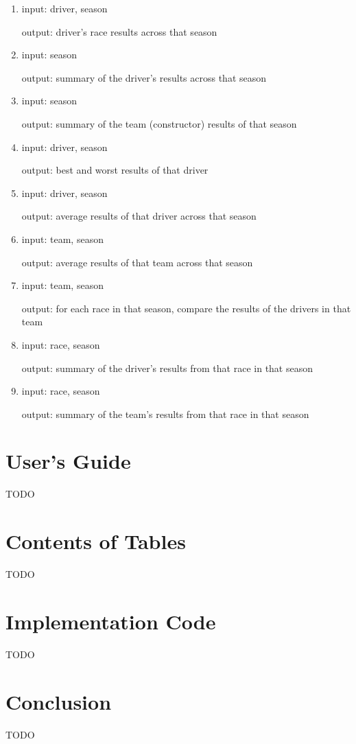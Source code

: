 \documentclass{article} %
\begin{document}
\begin{enumerate}[label=(\arabic*)]
    \item 
    input: driver, season

    output: driver's race results across that season 

    \item
    input: season

    output: summary of the driver's results across that season

    \item
    input: season

    output: summary of the team (constructor) results of that season

    \item 
    input: driver, season

    output: best and worst results of that driver 

    \item 
    input: driver, season

    output: average results of that driver across that season

    \item 
    input: team, season

    output: average results of that team across that season

    \item 
    input: team, season 

    output: for each race in that season, compare the results of the
    drivers in that team

    \item 
    input: race, season 
    
    output: summary of the driver's results from that race in that season

    \item 
    input: race, season 
    
    output: summary of the team's results from that race in that season

\end{enumerate}


\section{User's Guide}

TODO

\section{Contents of Tables}

TODO

\section{Implementation Code}

TODO

\section{Conclusion}

TODO
\end{document}

